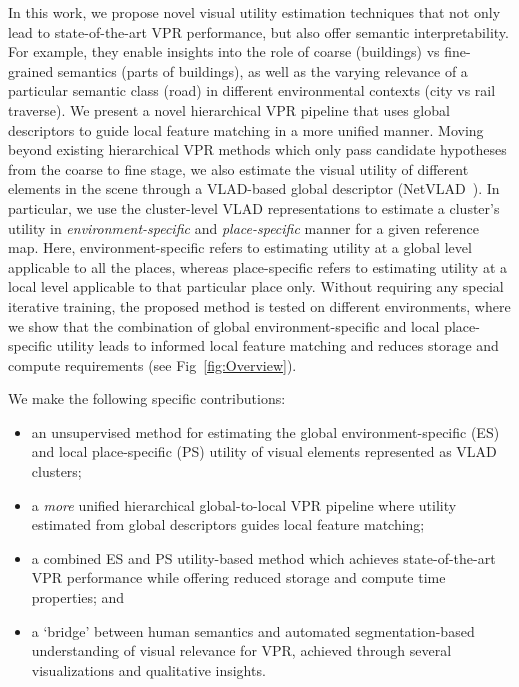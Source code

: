 \documentclass[letterpaper, 10 pt, conference]{ieeeconf}  \fi
\begin{document}
In this work, we propose novel visual utility estimation techniques that not only lead to state-of-the-art VPR performance, but also offer semantic interpretability. For example, they enable insights into the role of coarse (buildings) vs fine-grained semantics (parts of buildings), as well as the varying relevance of a particular semantic class (road) in different environmental contexts (city vs rail traverse). We present a novel hierarchical VPR pipeline that uses global descriptors to guide local feature matching in a more unified manner. Moving beyond existing hierarchical VPR methods which only pass candidate hypotheses from the coarse to fine stage, we also estimate the visual utility of different elements in the scene through a VLAD-based global descriptor (NetVLAD~\cite{arandjelovic2016netvlad}). In particular, we use the cluster-level VLAD representations to estimate a cluster's utility in \textit{environment-specific} and \textit{place-specific} manner for a given reference map. Here, environment-specific refers to estimating utility at a global level applicable to all the places, whereas place-specific refers to estimating utility at a local level applicable to that particular place only. Without requiring any special iterative training, the proposed method is tested on different environments, where we show that the combination of global environment-specific and local place-specific utility leads to informed local feature matching and reduces storage and compute requirements (see Fig~\ref{fig:Overview}).

We make the following specific contributions:

\begin{itemize}
    \item an unsupervised method for estimating the global environment-specific (ES) and local place-specific (PS) utility of visual elements represented as VLAD clusters;
    \item a \textit{more} unified hierarchical global-to-local VPR pipeline where utility estimated from global descriptors guides local feature matching;
    \item a combined ES and PS utility-based method which achieves state-of-the-art VPR performance while offering reduced storage and compute time properties; and
    \item a `bridge' between human semantics and automated segmentation-based understanding of visual relevance for VPR, achieved through several visualizations and qualitative insights.
\end{itemize}
\end{document}
